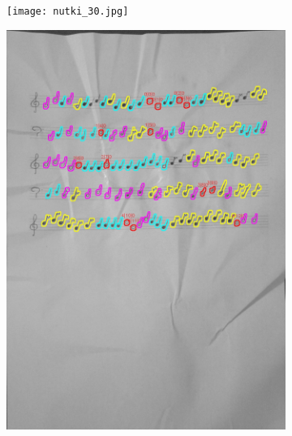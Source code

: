 \documentclass[11pt]{article}
\begin{document}
\begin{figure}[H]
    \centering
    \begin{subfigure}{.5\textwidth}
        \centering
        \graphicspath{ {Resources/} }
        \texttt{[image: nutki\_30.jpg]}
        \label{fig:sub1}
    \end{subfigure}%
    \begin{subfigure}{.5\textwidth}
        \centering
        \graphicspath{ {blobs/} }
        \includegraphics[width=\linewidth]{30_cnts.jpg}
        \label{fig:sub2}
    \end{subfigure}
    \label{fig:test}
\end{figure}
\end{document}
